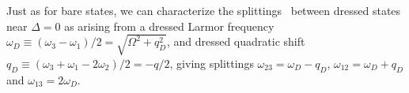\documentclass[aps,prl,reprint,superscriptaddress,floatfix]{revtex4-1}
\begin{document}
Just as for bare states, we can characterize the splittings~ between dressed states near $\Delta=0$ as arising from a dressed Larmor frequency $\omega_D\equiv(\omega_3-\omega_1)/2=\sqrt{\Omega^2+q_D^2}$, and dressed quadratic shift $q_D \equiv (\omega_3 + \omega_1 -2\omega_2)/2=-q/2$, giving splittings $\omega_{23}=\omega_D-q_D$, $\omega_{12}=\omega_D+q_D$ and $\omega_{13}=2\omega_D$. 
\end{document}
